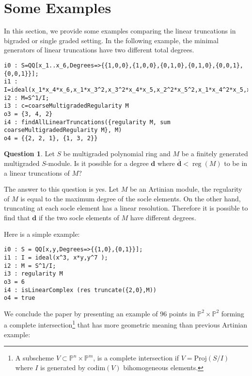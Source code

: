 \documentclass[11pt]{amsart}
\DeclareMathOperator{\reg}{reg}
\theoremstyle{definition}
\newtheorem{question}[thm]{Question}
\begin{document}
\section{Some Examples}
\noindent In this section, we provide some examples comparing the linear truncations in bigraded or single graded setting.  In the following example, the minimal generators of linear truncations have two different total degrees. 
  \begin{footnotesize}
 \begin{verbatim}
i0 : S=QQ[x_1..x_6,Degrees=>{{1,0,0},{1,0,0},{0,1,0},{0,1,0},{0,0,1},{0,0,1}}];
i1 : I=ideal(x_1*x_4*x_6,x_1*x_3^2,x_3^2*x_4*x_5,x_2^2*x_5^2,x_1*x_4^2*x_5,x_1*x_2^2*x_4);
i2 : M=S^1/I;
i3 : c=coarseMultigradedRegularity M
o3 = {3, 4, 2}
i4 : findAllLinearTruncations({regularity M, sum coarseMultigradedRegularity M}, M)
o4 = {{2, 2, 1}, {1, 3, 2}}
\end{verbatim}
\end{footnotesize}
\begin{question}
Let $S$ be multigraded polynomial ring and $M$ be a finitely generated  multigraded  $S$-module. Is it possible for a degree $\textbf{d}$ where $\bar{\textbf{d}}<\reg(M)$ to be in a linear truncations of $M$?
\end{question}
The answer to this question is yes.  Let $M$ be an Artinian module, the regularity of $M$ is equal to the maximum degree of the socle elements. On the other hand, truncating at each socle element has a linear resolution. Therefore it is possible to find that $\textbf{d}$ if the two socle elements of $M$ have different degrees. 

 Here is a simple example: 
\begin{footnotesize}
 \begin{verbatim}
i0 : S = QQ[x,y,Degrees=>{{1,0},{0,1}}];
i1 : I = ideal(x^3, x*y,y^7 );
i2 : M = S^1/I;
i3 : regularity M
o3 = 6
i4 : isLinearComplex (res truncate({2,0},M))
o4 = true
\end{verbatim}
\end{footnotesize}
We conclude the paper by presenting an example of  $96$ points in $\mathbb{P}^2\times \mathbb{P}^2$ forming a complete intersection\footnote{A subscheme $V \subset \mathbb{P}^n \times \mathbb{P}^m$, is a complete intersection if $V = \mathrm{Proj}(S/I)$ where $I$ is generated by $\mathrm{codim}(V)$ bihomogeneous elements.} that has more geometric meaning than previous Artinian example:
\end{document}
